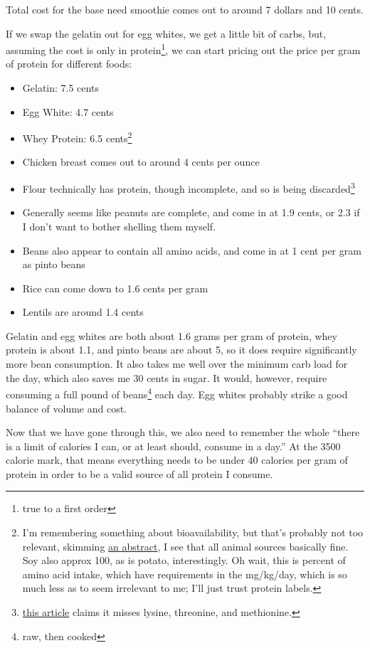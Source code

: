 \documentclass[12pt]{article}[titlepage]
\newcommand{\say}[1]{``#1''}
\renewcommand{\,}{\textsuperscript{,}}
\begin{document}
Total cost for the base need smoothie comes out to around 7 dollars and 10 cents.

If we swap the gelatin out for egg whites, we get a little bit of carbs, but, assuming the cost is only in protein\footnote{true to a first order}, we can start pricing out the price per gram of protein for different foods:

\begin{itemize}  
\item Gelatin: 7.5 cents  
\item Egg White: 4.7 cents  
\item Whey Protein: 6.5 cents\footnote{I'm remembering something about bioavailability, but that's probably not too relevant, skimming \href{https://pmc.ncbi.nlm.nih.gov/articles/PMC11171741/}{an abstract}, I see that all animal sources basically fine. Soy also approx 100, as is potato, interestingly. Oh wait, this is percent of amino acid intake, which have requirements in the mg/kg/day, which is so much less as to seem irrelevant to me; I'll just trust protein labels.}  
\item Chicken breast comes out to around 4 cents per ounce  
\item Flour technically has protein, though incomplete, and so is being discarded\footnote{\href{https://www.frontiersin.org/journals/nutrition/articles/10.3389/fnut.2020.00141/full}{this article} claims it misses lysine, threonine, and methionine.}  
\item Generally seems like peanuts are complete, and come in at 1.9 cents, or 2.3 if I don't want to bother shelling them myself.  
\item Beans also appear to contain all amino acids, and come in at 1 cent per gram as pinto beans  
\item Rice can come down to 1.6 cents per gram  
\item Lentils are around 1.4 cents  
\end{itemize}

Gelatin and egg whites are both about 1.6 grams per gram of protein, whey protein is about 1.1, and pinto beans are about 5, so it does require significantly more bean consumption. It also takes me well over the minimum carb load for the day, which also saves me 30 cents in sugar.  
It would, however, require consuming a full pound of beans\footnote{raw, then cooked} each day.  
Egg whites probably strike a good balance of volume and cost.

Now that we have gone through this, we also need to remember the whole \say{there is a limit of calories I can, or at least should, consume in a day.}  
At the 3500 calorie mark, that means everything needs to be under 40 calories per gram of protein in order to be a valid source of all protein I consume.
\end{document}
